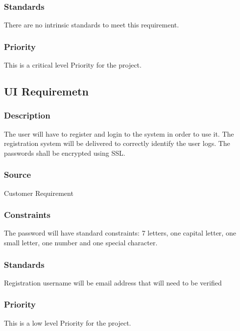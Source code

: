 \subsubsection{Standards}
There are no intrinsic standards to meet this requirement.
\subsubsection{Priority}
This is a critical level Priority for the project.

\subsection{UI Requiremetn}
\subsubsection{Description}
The user will have to register and login to the system in order to use it. The registration system will be delivered to correctly identify the user logs. The passwords shall be encrypted using SSL.
\subsubsection{Source}
Customer Requirement
\subsubsection{Constraints}
The password will have standard constraints: 7 letters, one capital letter, one small letter, one number and one special character.
\subsubsection{Standards}
Registration username will be email address that will need to be verified
\subsubsection{Priority}
This is a low level Priority for the project.
